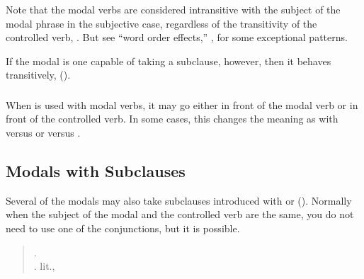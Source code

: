 \subsubsection{} Note that the modal verbs are considered intransitive
with the subject of the modal phrase in the subjective case,
regardless of the transitivity of the controlled verb,  .  But see ``word order
effects,'' , for some
exceptional patterns.

If the modal is one capable of taking a subclause, however, then it
behaves transitively,   ().

\subsubsection{}\label{syn:modal:neg}
When  is used with modal verbs, it may go either in front of the
modal verb or in front of the controlled verb.  In some cases, this
changes the meaning as with  
versus   or   versus  .

\subsection{Modals with Subclauses}
\label{syn:modal:new}\label{syn:modal:subclause}
Several of the modals may also take subclauses introduced
with  or  ().  Normally
when the subject of the modal and the controlled verb are the same,
you do not need to use one of the conjunctions, but it is possible.
 
 
 

\begin{quotation}
\noindent{}.   \\
\noindent{}.   lit., 
\end{quotation}

